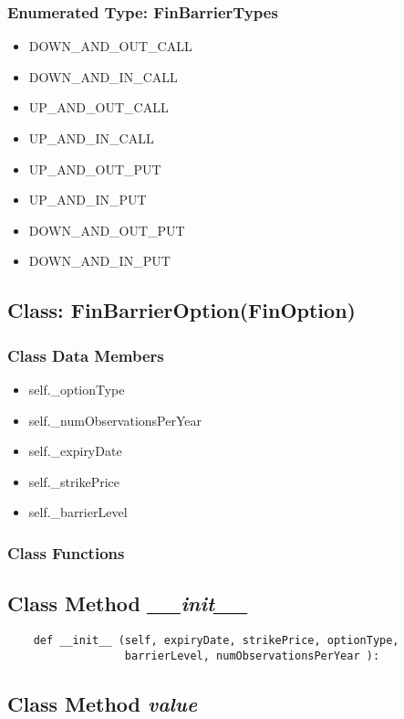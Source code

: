 \documentclass[twoside,11pt]{book}
\begin{document}
\subsubsection{Enumerated Type: FinBarrierTypes}
\begin{itemize}
\item{DOWN\_AND\_OUT\_CALL}
\item{DOWN\_AND\_IN\_CALL}
\item{UP\_AND\_OUT\_CALL}
\item{UP\_AND\_IN\_CALL}
\item{UP\_AND\_OUT\_PUT}
\item{UP\_AND\_IN\_PUT}
\item{DOWN\_AND\_OUT\_PUT}
\item{DOWN\_AND\_IN\_PUT}
\end{itemize}

\subsection{Class: FinBarrierOption(FinOption)}


\subsubsection{Class Data Members}
\begin{itemize}
\item{self.\_optionType}
\item{self.\_numObservationsPerYear}
\item{self.\_expiryDate}
\item{self.\_strikePrice}
\item{self.\_barrierLevel}
\end{itemize}

\subsubsection{Class Functions}

\subsection{Class Method {\it \_\_init\_\_ }}


\begin{lstlisting}
    def __init__ (self, expiryDate, strikePrice, optionType, 
                  barrierLevel, numObservationsPerYear ):
\end{lstlisting}

\subsection{Class Method {\it value}}
\end{document}
